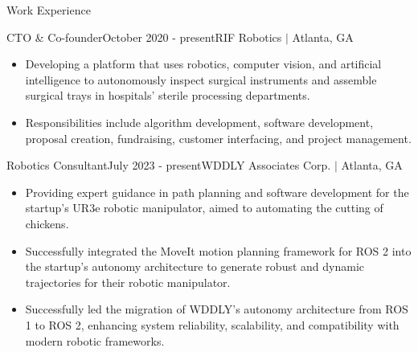 \documentclass{resume} %
\newcommand{\sectionspace}{\vspace{3mm}}
\begin{document}

\sectionspace
\begin{rSection}{Work Experience}

\begin{rSubsection}{CTO \& Co-founder}{October 2020 - present}{RIF Robotics $\vert$ Atlanta, GA}{}

\item
\begin{itemize}
\item Developing a platform that uses robotics, computer vision, and artificial
  intelligence to autonomously inspect surgical instruments and assemble
  surgical trays in hospitals’ sterile processing departments.

\item Responsibilities include algorithm development, software development,
  proposal creation, fundraising, customer interfacing, and project management.

\end{itemize}

\end{rSubsection}


\begin{rSubsection}{Robotics Consultant}{July 2023 - present}{WDDLY Associates Corp. $\vert$ Atlanta, GA}{}

\item
\begin{itemize}
\item Providing expert guidance in path planning and software development for
  the startup's UR3e robotic manipulator, aimed to automating the cutting of
  chickens.

\item Successfully integrated the MoveIt motion planning framework for ROS 2
  into the startup's autonomy architecture to generate robust and dynamic
  trajectories for their robotic manipulator.

\item Successfully led the migration of WDDLY's autonomy architecture from ROS 1
  to ROS 2, enhancing system reliability, scalability, and compatibility with
  modern robotic frameworks.

\end{itemize}


\end{rSubsection}
\end{rSection}
\end{document}

